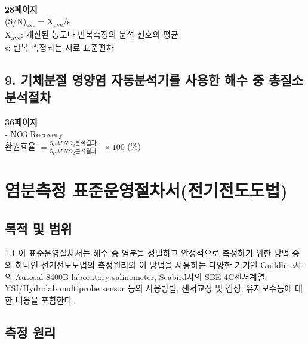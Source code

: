 \documentclass[
]{book}
\begin{document}
\textbf{28페이지}\\
(S/N)\textsubscript{est} = X\textsubscript{ave}/s\\
X\textsubscript{ave}: 계산된 농도나 반복측정의 분석 신호의 평균\\
s: 반복 측정되는 시료 표준편차

\hypertarget{uxae30uxccb4uxbd84uxc808-uxc601uxc591uxc5fc-uxc790uxb3d9uxbd84uxc11duxae30uxb97c-uxc0acuxc6a9uxd55c-uxd574uxc218-uxc911-uxcd1duxc9c8uxc18c-uxbd84uxc11duxc808uxcc28}{%
\section{9. 기체분절 영양염 자동분석기를 사용한 해수 중 총질소 분석절차}\label{uxae30uxccb4uxbd84uxc808-uxc601uxc591uxc5fc-uxc790uxb3d9uxbd84uxc11duxae30uxb97c-uxc0acuxc6a9uxd55c-uxd574uxc218-uxc911-uxcd1duxc9c8uxc18c-uxbd84uxc11duxc808uxcc28}}

\textbf{36페이지}\\
- NO3 Recovery\\
환원효율 \(= \frac{5\mu M ~ NO_{3} 분석결과}{5\mu M ~ NO_{2} 분석결과}~~~ \times 100\) (\%)

\hypertarget{uxc5fcuxbd84uxce21uxc815-uxd45cuxc900uxc6b4uxc601uxc808uxcc28uxc11cuxc804uxae30uxc804uxb3c4uxb3c4uxbc95}{%
\chapter{염분측정 표준운영절차서(전기전도도법)}\label{uxc5fcuxbd84uxce21uxc815-uxd45cuxc900uxc6b4uxc601uxc808uxcc28uxc11cuxc804uxae30uxc804uxb3c4uxb3c4uxbc95}}

\hypertarget{uxbaa9uxc801-uxbc0f-uxbc94uxc704-1}{%
\section{목적 및 범위}\label{uxbaa9uxc801-uxbc0f-uxbc94uxc704-1}}

1.1 이 표준운영절차서는 해수 중 염분을 정밀하고 안정적으로 측정하기 위한 방법 중의 하나인 전기전도도법의 측정원리와 이 방법을 사용하는 다양한 기기인 Guildline사 의 Autosal 8400B laboratory salinometer, Seabird사의 SBE 4C센서계열, YSI/Hydrolab multiprobe sensor 등의 사용방법, 센서교정 및 검정, 유지보수등에 대한 내용을 포함한다.

\hypertarget{uxce21uxc815-uxc6d0uxb9ac-1}{%
\section{측정 원리}\label{uxce21uxc815-uxc6d0uxb9ac-1}}
\end{document}
